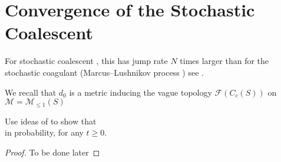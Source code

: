 \section{Convergence of the Stochastic Coalescent}
For stochastic coalescent \cite{A99}, this has jump rate $N$ times larger than for the stochastic coagulant (Marcus--Lushnikov process \cite{L78}) see \cite{N00}.

We recall that $d_0$ is a metric inducing the vague topology $\mathcal{F}(C_c(S))$ on $\mathcal{M}=\mathcal{M}_{\le 1}(S)$ 
\begin{lemma}\label{lemma: local uniform convergence of stochastic coagulent} Use ideas of \cite{N99} to show that \begin{equation}
\end{equation} in probability, for any $t\geq 0$.\end{lemma} \begin{proof} To be done later \end{proof}

